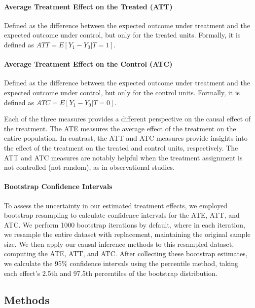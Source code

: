 \documentclass{article}
\begin{document}
\paragraph{Average Treatment Effect on the Treated (ATT)} Defined as the difference between the expected outcome under treatment and the expected outcome under control, but only for the treated units. Formally, it is defined as $ATT = E[Y_1 - Y_0 | T = 1]$. 

\paragraph{Average Treatment Effect on the Control (ATC)} Defined as the difference between the expected outcome under treatment and the expected outcome under control, but only for the control units. Formally, it is defined as $ATC = E[Y_1 - Y_0 | T = 0]$. 

Each of the three measures provides a different perspective on the causal effect of the treatment. The ATE measures the average effect of the treatment on the entire population. In contrast, the ATT and ATC measures provide insights into the effect of the treatment on the treated and control units, respectively. The ATT and ATC measures are notably helpful when the treatment assignment is not controlled (not random), as in observational studies.

\paragraph{Bootstrap Confidence Intervals} To assess the uncertainty in our estimated treatment effects, we employed bootstrap resampling to calculate confidence intervals for the ATE, ATT, and ATC. We perform 1000 bootstrap iterations by default, where in each iteration, we resample the entire dataset with replacement, maintaining the original sample size. We then apply our causal inference methods to this resampled dataset, computing the ATE, ATT, and ATC. After collecting these bootstrap estimates, we calculate the 95\% confidence intervals using the percentile method, taking each effect's 2.5th and 97.5th percentiles of the bootstrap distribution. 

\subsection{Methods}
\end{document}
